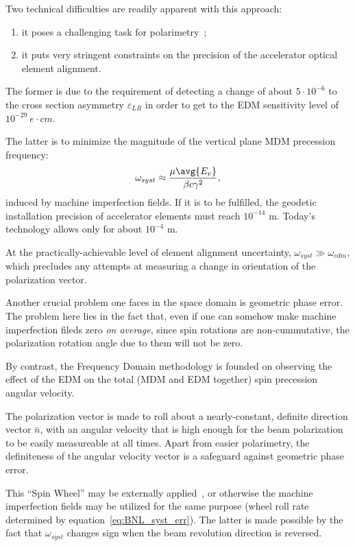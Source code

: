 \documentclass[a4paper]{jacow}
\newcommand{\w}{\omega}
\newcommand{\nbar}{\bar n}
\begin{document}
Two technical difficulties are readily apparent with this approach:
\begin{enumerate}
\item it poses a challenging task for polarimetry~\cite{Mane:SpinWheel};
\item it puts very stringent constraints on the precision of the accelerator optical element alignment.
\end{enumerate}

The former is due to the requirement of detecting a change of about $5\cdot 10^{-6}$ to the
cross section asymmetry $\varepsilon_{LR}$ in order to get to the EDM sensitivity level
of $10^{-29}~e\cdot cm$.~\cite[p.~18]{BNL:Deuteron2008}

The latter is to minimize the magnitude of the vertical plane
MDM precession frequency:~\cite[p.~11]{BNL:Deuteron2008}
\begin{equation}\label{eq:BNL_syst_err}
\w_{syst} \approx \frac{\mu\avg{E_v}}{\beta c\gamma^2},
\end{equation}
induced by machine imperfection fields. If it is to be fulfilled, the geodetic installation precision
of accelerator elements must reach $10^{-14}$ m. Today's technology allows only for about $10^{-4}$ m.

At the practically-achievable level of element alignment uncertainty, $\w_{syst} \gg \w_{edm}$,
which precludes any attempts at measuring a change in orientation of the polarization vector.

Another crucial problem one faces in the space domain is geometric phase error.~\cite[p.~6]{BNL:Proton}
The problem here lies in the fact that, even if one can somehow make machine imperfection fileds zero
\emph{on average}, since spin rotations are non-cummutative, the polarization rotation angle due to them
will not be zero.

By contrast, the Frequency Domain methodology is founded on observing the effect of the EDM on the total
(MDM and EDM together) spin precession angular velocity.

The polarization vector is made to roll about a nearly-constant, definite direction vector $\nbar$,
with an angular velocity that is high enough for the beam polarization to be easily measureable at all times.
Apart from easier polarimetry, the definiteness of the angular velocity vector is a safeguard against geometric
phase error.

This ``Spin Wheel'' may be externally applied~\cite{Koop:SW}, or otherwise the machine imperfection fields
may be utilized for the same purpose (wheel roll rate determined by equation~\eqref{eq:BNL_syst_err}).
The latter is made possible by the fact that $\w_{syst}$ changes sign when the beam revolution direction
is reversed.~\cite[p.~11]{BNL:Deuteron2008}
\end{document}
